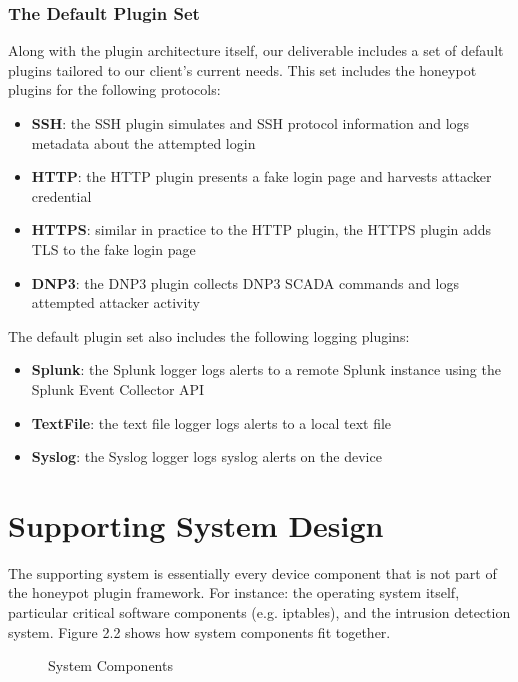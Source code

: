 \subsubsection{The Default Plugin Set}

Along with the plugin architecture itself, our deliverable includes a set
of default plugins tailored to our client's current needs. This set includes
the honeypot plugins for the following protocols:
\begin{itemize}
    \item \textbf{SSH}: the SSH plugin simulates and SSH protocol information and
    logs metadata about the attempted login
    \item \textbf{HTTP}: the HTTP plugin presents a fake login page and harvests
    attacker credential
    \item \textbf{HTTPS}: similar in practice to the HTTP plugin, the HTTPS plugin
    adds TLS to the fake login page
    \item \textbf{DNP3}: the DNP3 plugin collects DNP3 SCADA commands and logs
    attempted attacker activity
\end{itemize}

The default plugin set also includes the following logging plugins:
\begin{itemize}
    \item \textbf{Splunk}: the Splunk logger logs alerts to a remote Splunk
    instance using the Splunk Event Collector API
    \item \textbf{TextFile}: the text file logger logs alerts to a local text
    file
    \item \textbf{Syslog}: the Syslog logger logs syslog alerts on the device
\end{itemize}


\section{Supporting System Design}

The supporting system is essentially every device component that is not part of
the honeypot plugin framework. For instance: the operating system itself,
particular critical software components (e.g. iptables), and the intrusion
detection system. Figure 2.2 shows how system components fit
together.

\begin{center}
\begin{figure}
{
\scalebox{0.7}{}
}
\label{fig:device2}
\caption{System Components}
\end{figure}
\end{center}

